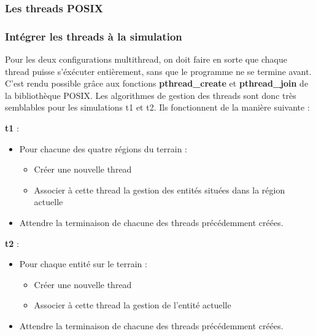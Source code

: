\documentclass[11pt]{article} %
\begin{document}
\subsubsection{Les threads POSIX}

\subsubsection{Intégrer les threads à la simulation}
Pour les deux configurations multithread, on doit faire en sorte que chaque thread puisse s'éxécuter entièrement, sans que le programme ne se termine avant. C'est rendu possible grâce aux fonctions \textbf{pthread\_create} et \textbf{pthread\_join} de la bibliothèque POSIX. Les algorithmes de gestion des threads sont donc très semblables pour les simulations t1 et t2. Ils fonctionnent de la manière suivante : 

\newpage

\textbf{t1} :
\begin{itemize}
\item Pour chacune des quatre régions du terrain :
	\begin{itemize}
		\item Créer une nouvelle thread
		\item Associer à cette thread la gestion des entités situées dans la région actuelle
	\end{itemize}

\item Attendre la terminaison de chacune des threads précédemment créées.

\end{itemize} 
 
\textbf{t2} :
\begin{itemize}
\item Pour chaque entité sur le terrain :
	\begin{itemize}
		\item Créer une nouvelle thread
		\item Associer à cette thread la gestion de l'entité actuelle
	\end{itemize}

\item Attendre la terminaison de chacune des threads précédemment créées.

\end{itemize}
\end{document}
